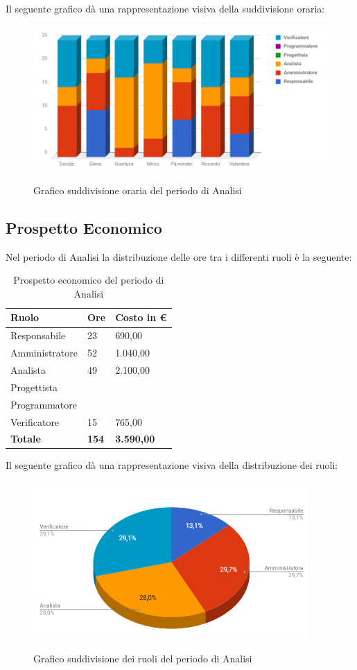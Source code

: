 \documentclass[PianoDiProgetto.tex]{subfiles}
\begin{document}
Il seguente grafico dà una rappresentazione visiva della suddivisione oraria:
\begin{figure}[h]
	\includegraphics[width=14.5cm]{images/prospettoOrario/analisi.png}
	\label{fig:foo}
	\caption{Grafico suddivisione oraria del periodo di Analisi}
\end{figure} 

\subsection{Prospetto Economico}
Nel periodo di Analisi la distribuzione delle ore tra i differenti ruoli è la seguente:\\
\begin{table}[htbp]
	\centering
	\renewcommand\arraystretch{1.5}
	\begin{tabularx}{\textwidth}{p{5cm}|p{4cm}|p{4cm}}
		\hline
		\textbf{Ruolo} & \textbf{Ore} & \textbf{Costo in \euro} \\
		\hline
		Responsabile & 23 & 690,00 \\
		\hline
		Amministratore & 52 & 1.040,00 \\
		\hline
		Analista & 49 & 2.100,00 \\
		\hline
		Progettista & \ & \ \\
		\hline
		Programmatore & \ & \ \\
		\hline
		Verificatore & 15 & 765,00 \\
		\hline
		\textbf{Totale} & \textbf{154} & \textbf{3.590,00}\\
		\hline
	\end{tabularx}
	\caption{Prospetto economico del periodo di Analisi}
	\label{my-label}
\end{table} \newpage
Il seguente grafico dà una rappresentazione visiva della distribuzione dei ruoli:
\begin{figure}[h]
	\centering
	\includegraphics[width=10.5cm]{images/prospettoEconomico/analisi.png}
	\label{fig:foo}
	\caption{Grafico suddivisione dei ruoli del periodo di Analisi}
\end{figure} 
\end{document}
